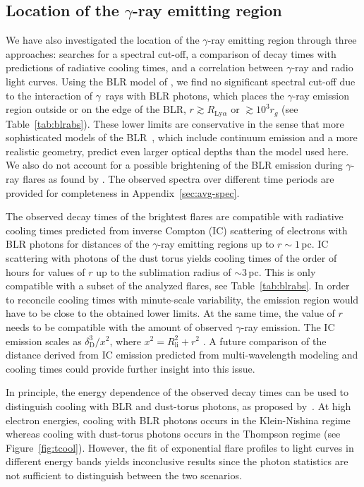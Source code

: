 \documentclass[twocolumn,linenumbers]{aastex62}
\newcommand{\Grays}{$\gamma$~rays\xspace}
\newcommand{\gray}{$\gamma$-ray\xspace}
\begin{document}
\subsection{Location of the $\gamma$-ray emitting region}
We have also investigated the location of the \gray emitting region  through three approaches: searches for a spectral cut-off, a comparison of decay times with predictions of radiative cooling times, and a correlation between \gray and radio light curves. 
Using the BLR model of \citet{finke2016}, we find no significant spectral cut-off due to the interaction of \Grays with BLR photons, which places the \gray emission region outside or on the edge of the BLR, $r \gtrsim R_{\mathrm{Ly}\alpha}$ or $\gtrsim 10^3r_g$ (see Table~\ref{tab:blrabs}). 
These lower limits are conservative in the sense that more sophisticated models of the BLR~\citep[e.g.,][]{2017MNRAS.464..152A}, which include continuum emission and a more realistic geometry, predict even larger optical depths than the model used here.
We also do not account for a possible brightening of the BLR emission during \gray flares as found by \citet{2013ApJ...763L..36L}.
The observed spectra over different time periods are provided for completeness in Appendix~\ref{sec:avg-spec}.

The observed decay times of the brightest flares are compatible with radiative cooling times predicted from inverse Compton (IC) scattering of electrons with BLR photons for distances of the \gray emitting regions up to $r\sim 1\,$pc. 
IC scattering with photons of the dust torus yields cooling times of the order of hours for values of $r$ up to the sublimation radius of $\sim 3\,$pc. 
This is only compatible with a subset of the analyzed flares, see Table~\ref{tab:blrabs}.
In order to reconcile cooling times with minute-scale variability, the emission region would have to be close to the obtained lower limits. 
At the same time, the value of $r$ needs to be compatible with the amount of observed \gray emission. The IC emission scales as $\delta_\mathrm{D}^3 / x^2$, where $x^2 = R_\mathrm{li}^2 + r^2$ \citep[see, e.g., Eq. 87 in][]{finke2016}. 
A future comparison of the distance derived from IC emission predicted from multi-wavelength modeling and cooling times could provide further insight into this issue.

In principle, the energy dependence of the observed decay times can be used to distinguish cooling with BLR and dust-torus photons, as proposed by~\citet{2012ApJ...758L..15D}. 
At high electron energies, cooling with BLR photons occurs in the Klein-Nishina regime whereas cooling with dust-torus photons occurs in the Thompson regime (see Figure~\ref{fig:tcool}).
However, the fit of exponential flare profiles to light curves in different energy bands yields inconclusive results since the photon statistics are not sufficient to distinguish between the two scenarios.
\end{document}
